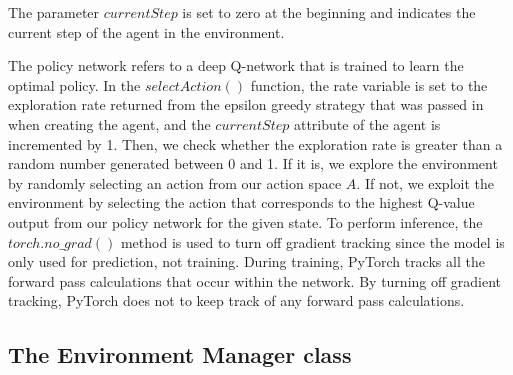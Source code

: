 \documentclass[12pt,oneside]{article}
\begin{document}
The parameter $currentStep$ is set to zero at the beginning and indicates the current step of the agent in the environment.

The policy network refers to a deep Q-network that is trained to learn the optimal policy. In the $selectAction()$ function, the rate variable is set to the exploration rate returned from the epsilon greedy strategy that was passed in when creating the agent, and the $currentStep$ attribute of the agent is incremented by 1. 
Then, we check whether the exploration rate is greater than a random number generated between 0 and 1. If it is, we explore the environment by randomly selecting an action from our action space $A$. If not, we exploit the environment by selecting the action that corresponds to the highest Q-value output from our policy network for the given state. To perform inference, the $torch.no\_grad()$ method is used to turn off gradient tracking since the model is only used for prediction, not training. During training, PyTorch tracks all the forward pass calculations that occur within the network. By turning off gradient tracking,  PyTorch does not to keep track of any forward pass calculations.

\subsection{The Environment Manager class}
\end{document}

